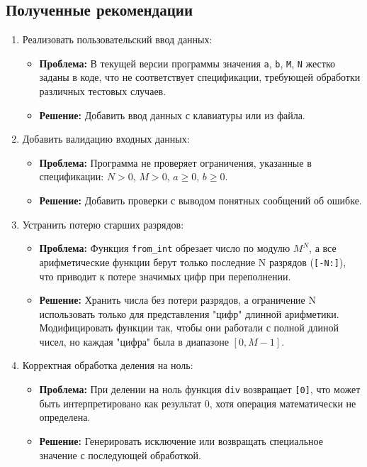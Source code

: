 \documentclass{article}[14pt]
\begin{document}
\subsection{Полученные рекомендации}

\begin{enumerate}
\item Реализовать пользовательский ввод данных:
\begin{itemize}
    \item \textbf{Проблема:} В текущей версии программы значения \texttt{a}, \texttt{b}, \texttt{M}, \texttt{N} жестко заданы в коде, что не соответствует спецификации, требующей обработки различных тестовых случаев.
    \item \textbf{Решение:} Добавить ввод данных с клавиатуры или из файла.
\end{itemize}

\item Добавить валидацию входных данных:
\begin{itemize}
    \item \textbf{Проблема:} Программа не проверяет ограничения, указанные в спецификации: $N > 0$, $M > 0$, $a \geq 0$, $b \geq 0$.
    \item \textbf{Решение:} Добавить проверки с выводом понятных сообщений об ошибке.
\end{itemize}

\item Устранить потерю старших разрядов:
\begin{itemize}
    \item \textbf{Проблема:} Функция \texttt{from\_int} обрезает число по модулю $M^N$, а все арифметические функции берут только последние N разрядов (\texttt{[-N:]}), что приводит к потере значимых цифр при переполнении.
    \item \textbf{Решение:} Хранить числа без потери разрядов, а ограничение N использовать только для представления "цифр" длинной арифметики. Модифицировать функции так, чтобы они работали с полной длиной чисел, но каждая "цифра" была в диапазоне $[0, M-1]$.
\end{itemize}

\item Корректная обработка деления на ноль:
\begin{itemize}
    \item \textbf{Проблема:} При делении на ноль функция \texttt{div} возвращает \texttt{[0]}, что может быть интерпретировано как результат 0, хотя операция математически не определена.
    \item \textbf{Решение:} Генерировать исключение или возвращать специальное значение с последующей обработкой.
\end{itemize}


\end{enumerate}
\end{document}
